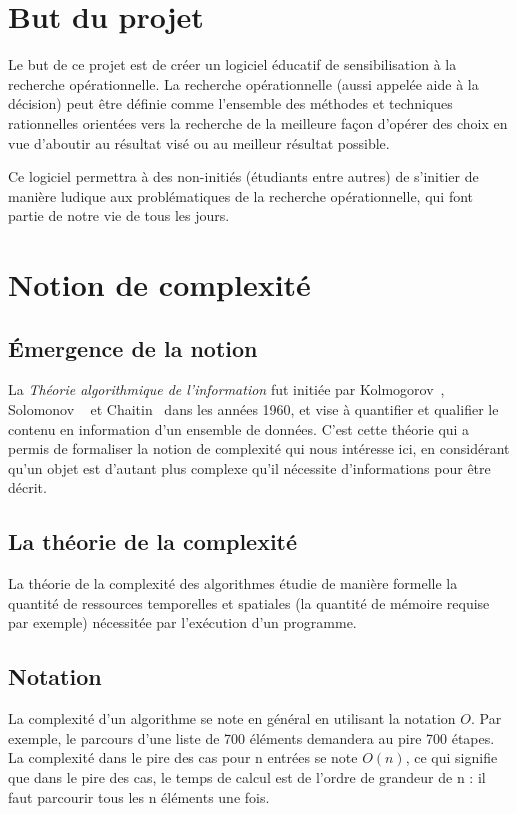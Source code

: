 \setcounter{footnote}{0}

\section{But du projet}
Le but de ce projet est de créer un logiciel éducatif de sensibilisation à la recherche
opérationnelle. La recherche opérationnelle (aussi appelée aide à la décision) peut être définie
comme l'ensemble des méthodes et techniques rationnelles orientées vers la recherche de
la meilleure façon d'opérer des choix en vue d'aboutir au résultat visé ou au meilleur résultat possible.%
~\cite{ref.yrr}

Ce logiciel permettra à des non-initiés (étudiants entre autres) de s'initier
de manière ludique aux problématiques de la recherche opérationnelle, qui font partie de notre
vie de tous les jours.


\section{Notion de complexité}
\subsection{Émergence de la notion}
La \emph{Théorie algorithmique de l'information} fut initiée par Kolmogorov~\cite{ref.kol}, Solomonov%
~\cite{ref.sol} et Chaitin~\cite{ref.cha}
dans les années 1960, et vise à quantifier et qualifier le contenu en information d'un ensemble de données.
C'est cette théorie qui a permis de formaliser la notion de complexité qui nous intéresse ici,
en considérant qu'un objet est d'autant plus complexe qu'il nécessite d'informations pour être décrit.
\subsection{La théorie de la complexité}
La théorie de la complexité des algorithmes étudie de manière formelle la quantité de ressources
temporelles et spatiales (la quantité de mémoire requise par exemple) nécessitée
par l'exécution d'un programme.
\subsection{Notation} La complexité d'un algorithme se note en général en utilisant
la notation $O$.
Par exemple, le parcours d'une liste de 700 éléments demandera au pire 700 étapes.
La complexité dans le pire des cas pour n entrées se note $O(n)$, ce qui signifie que dans le pire
des cas, le temps de calcul est de l'ordre de grandeur de n : il faut parcourir tous les n
éléments une fois.

